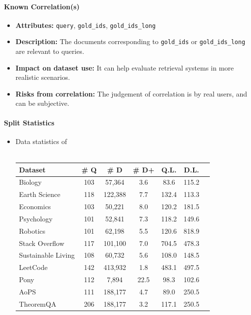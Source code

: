 \paragraph{Known Correlation(s)}
\begin{itemize}
    \item \textbf{Attributes:} \texttt{query}, \texttt{gold\_ids}, \texttt{gold\_ids\_long}
    \item \textbf{Description:} The documents corresponding to \texttt{gold\_ids} or \texttt{gold\_ids\_long} are relevant to queries.
    \item \textbf{Impact on dataset use:} It can help evaluate retrieval systems in more realistic scenarios.
    \item \textbf{Risks from correlation:} The judgement of correlation is by real users, and can be subjective.
\end{itemize}

\paragraph{Split Statistics}
\begin{itemize}
\item Data statistics of \ours
\\\\
\begin{tabular}{lcccccc}
\hline
\textbf{Dataset} & \textbf{\# Q} & \textbf{\# D} & \textbf{\# D+} & \textbf{Q.L.} & \textbf{D.L.} \\ \hline
Biology & 103 & 57,364 & 3.6 & 83.6 & 115.2 \\
Earth Science & 118 & 122,388 & 7.7 & 132.4 & 113.3 \\
Economics & 103 & 50,221 & 8.0 & 120.2 & 181.5 \\
Psychology & 101 & 52,841 & 7.3 & 118.2 & 149.6 \\
Robotics & 101 & 62,198 & 5.5 & 120.6 & 818.9 \\
Stack Overflow & 117 & 101,100 & 7.0 & 704.5 & 478.3 \\
Sustainable Living & 108 & 60,732 & 5.6 & 108.0 & 148.5 \\
LeetCode & 142 & 413,932 & 1.8 & 483.1 & 497.5 \\
Pony & 112 & 7,894 & 22.5 & 98.3 & 102.6 \\
AoPS & 111 & 188,177 & 4.7 & 89.0 & 250.5 \\
TheoremQA & 206 & 188,177 & 3.2 & 117.1 & 250.5 \\ \hline
\end{tabular}
\end{itemize}

